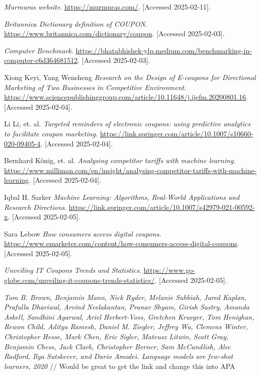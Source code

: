 \documentclass[licencjacka,en]{docs/pracamgr}
\begin{document}
\begin{thebibliography}{99}


\textit{Murmuras website}.  
\url{https://murmuras.com/}.  
[Accessed 2025-02-11].

\textit{Britannica Dictionary definition of COUPON}.  
\url{https://www.britannica.com/dictionary/coupon}.  
[Accessed 2025-02-03].

\textit{Computer Benchmark}.  
\url{https://bhatabhishek-ylp.medium.com/benchmarking-in-computer-c6d364681512}.  
[Accessed 2025-02-03].

Xiong Keyi, Yang Wensheng
\textit{Research on the Design of E-coupons for Directional Marketing of Two Businesses in Competitive Environment}.  
\url{https://www.sciencepublishinggroup.com/article/10.11648/j.ijefm.20200801.16}.  
[Accessed 2025-02-04].

Li Li, et. al.
\textit{Targeted reminders of electronic coupons: using predictive analytics to facilitate coupon marketing}.  
\url{https://link.springer.com/article/10.1007/s10660-020-09405-4}.  
[Accessed 2025-02-04].

Bernhard König, et. al.
\textit{Analysing competitor tariffs with machine learning}.  
\url{https://www.milliman.com/en/insight/analysing-competitor-tariffs-with-machine-learning}.  
[Accessed 2025-02-04].

Iqbal H. Sarker
\textit{Machine Learning: Algorithms, Real-World Applications and Research Directions}.  
\url{https://link.springer.com/article/10.1007/s42979-021-00592-x}.  
[Accessed 2025-02-05].

Sara Lebow 
\textit{How consumers access digital coupons}.  
\url{https://www.emarketer.com/content/how-consumers-access-digital-coupons}.  
[Accessed 2025-02-05].

\textit{Unveiling IT Coupons Trends and Statistics}.  
\url{https://www.go-globe.com/unveiling-it-coupons-trends-statistics/}.  
[Accessed 2025-02-05].

\textit{Tom B. Brown, Benjamin Mann, Nick Ryder, Melanie Subbiah, Jared
Kaplan, Prafulla Dhariwal, Arvind Neelakantan, Pranav Shyam, Girish
Sastry, Amanda Askell, Sandhini Agarwal, Ariel Herbert-Voss, Gretchen
Krueger, Tom Henighan, Rewon Child, Aditya Ramesh, Daniel M.
Ziegler, Jeffrey Wu, Clemens Winter, Christopher Hesse, Mark Chen,
Eric Sigler, Mateusz Litwin, Scott Gray, Benjamin Chess, Jack Clark,
Christopher Berner, Sam McCandlish, Alec Radford, Ilya Sutskever, and
Dario Amodei. Language models are few-shot learners, 2020}
// Would be great to get the link and change this into APA


\end{thebibliography}
\end{document}
